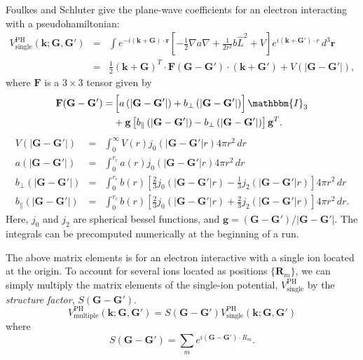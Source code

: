 \documentclass{article}
\begin{document}
Foulkes and Schluter give the plane-wave coefficients for an electron
interacting with a pseudohamiltonian\cite{FS}:
\newcommand{\vk}{\mathbf{k}}
\newcommand{\vG}{\mathbf{G}}
\newcommand{\vGp}{\mathbf{G'}}
\newcommand{\vg}{\mathbf{g}}
\newcommand{\vr}{\mathbf{r}}
\begin{eqnarray}
V^\text{PH}_\text{single}(\vk; \vG, \vGp) & = &
\int e^{-i(\vk+\vG)\cdot \vr} \left[ -\frac{1}{2} \nabla a \nabla +
  \frac{1}{2r^2} b \hat{L}^2 + V \right] e^{i(\vk+\vGp)\cdot r} \, d^3
\vr \nonumber \\
& = & \frac{1}{2} (\vk + \vG)^T \cdot \mathbf{F}(\vG - \vGp)\cdot (\vk
+ \vGp) + V(|\vG - \vGp|),
\end{eqnarray}
where $\mathbf{F}$ is a $3\times 3$ tensor given by
\begin{equation}
\begin{split}
\mathbf{F}(\vG - \vGp) = & \left[ \rule{0cm}{0.33cm} a\left(|\vG-\vGp|\right) +
  b_\perp\left(|\vG-\vGp| \right) \right]\mathbbm{I}_3 \\
& + \vg \left[b_\parallel\left(|\vG-\vGp|\right) - 
  b_\perp\left( |\vG -\vGp|\right)   \right]\vg^T.
\end{split}
\end{equation}
\begin{eqnarray}
V(|\vG - \vGp|) & = & \int_0^\infty V(r) j_0(|\vG - \vGp|r) 4\pi r^2
\, dr \\
a(|\vG-\vGp|) & = &\int_0^{r_c} a(r) j_0(|\vG-\vGp|r) 4\pi r^2 \, dr \\
b_\perp(|\vG-\vGp|) & = &
\int_0^{r_c} b(r)\left[ {\textstyle \frac{2}{3}}
  j_0(|\vG-\vGp|r)-{\textstyle\frac{1}{3}}j_2(|\vG - \vGp|r)
  \right]4\pi r^2 \, dr\\
b_\parallel(|\vG-\vGp|) & = &
\int_0^{r_c} b(r)\left[ {\textstyle \frac{2}{3}}
  j_0(|\vG-\vGp|r)+{\textstyle\frac{2}{3}}j_2(|\vG - \vGp|r) \right]4\pi r^2 \, dr.
\end{eqnarray}
Here, $j_0$ and $j_2$ are spherical bessel functions, and $\vg = (\vG
- \vGp)/ |\vG -\vGp|$.  The integrals can be precomputed numerically
at the beginning of a run.

The above matrix elements is for an electron interactive with a single
ion located at the origin.  To account for several ions located as
positions $\{\mathbf{R}_m \}$, we can simply multiply the matrix
elements of the single-ion potential, $V^\text{PH}_\text{single}$ by
the {\em structure factor}, $S(\vG - \vGp)$.
\begin{equation}
V^\text{PH}_\text{multiple}(\vk;\vG,\vGp) = S(\vG-\vGp) V^\text{PH}_\text{single}
(\vk;\vG,\vGp)
\end{equation}
where
\begin{equation}
S(\vG - \vGp) = \sum_m e^{i(\vG -\vGp)\cdot R_m}.
\end{equation}
\end{document}
